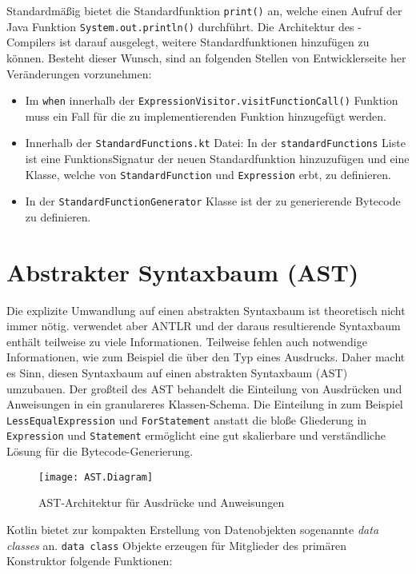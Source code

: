 Standardmäßig bietet \toya die Standardfunktion \texttt{print()} an, welche einen Aufruf der Java Funktion \texttt{System.out.println()} durchführt. Die Architektur des \toya-Compilers ist darauf ausgelegt, weitere Standardfunktionen hinzufügen zu können. Besteht dieser Wunsch, sind an folgenden Stellen von Entwicklerseite her Veränderungen vorzunehmen:

\begin{itemize}
    \item Im \texttt{when} innerhalb der \texttt{ExpressionVisitor.visitFunctionCall()} Funktion muss ein Fall für die zu implementierenden Funktion hinzugefügt werden.
    \item Innerhalb der \texttt{StandardFunctions.kt} Datei: In der \texttt{standardFunctions} Liste ist eine FunktionsSignatur der neuen Standardfunktion hinzuzufügen und eine Klasse, welche von \texttt{StandardFunction} und \texttt{Expression} erbt, zu definieren.
    \item In der \texttt{StandardFunctionGenerator} Klasse ist der zu generierende Bytecode zu definieren.
\end{itemize}

\section{Abstrakter Syntaxbaum (AST)}

Die explizite Umwandlung auf einen abstrakten Syntaxbaum ist theoretisch nicht immer nötig. \toya verwendet aber ANTLR und der daraus resultierende Syntaxbaum enthält teilweise zu viele Informationen. Teilweise fehlen auch notwendige Informationen, wie zum Beispiel die über den Typ eines Ausdrucks. Daher macht es Sinn, diesen Syntaxbaum auf einen abstrakten Syntaxbaum (AST) umzubauen. Der großteil des AST behandelt die Einteilung von Ausdrücken und Anweisungen in ein granulareres Klassen-Schema. Die Einteilung in zum Beispiel \texttt{LessEqualExpression} und \texttt{ForStatement} anstatt die bloße Gliederung in \texttt{Expression} und \texttt{Statement} ermöglicht eine gut skalierbare und verständliche Lösung für die Bytecode-Generierung. 

\begin{figure}
    \caption{AST-Architektur für Ausdrücke und Anweisungen}
    \centering
    \texttt{[image: AST.Diagram]}
    \label{fig:ast-architecture}
\end{figure}

Kotlin bietet zur kompakten Erstellung von Datenobjekten sogenannte \textit{data classes} an. \texttt{data class} Objekte erzeugen für Mitglieder des primären Konstruktor folgende Funktionen:

